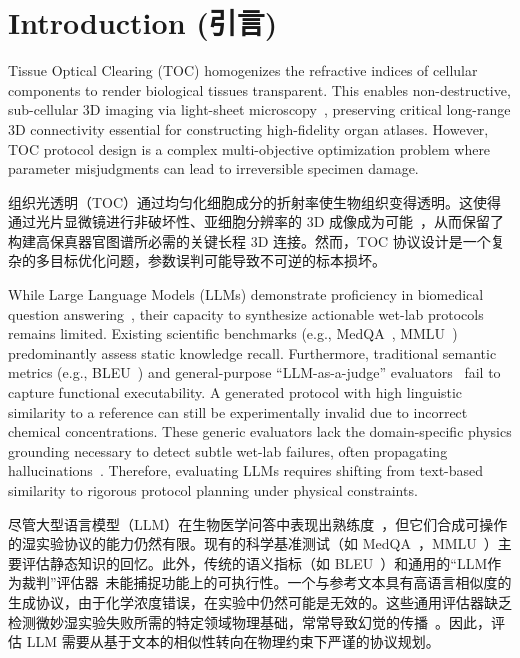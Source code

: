 \documentclass[runningheads]{llncs}
\begin{document}
\section{Introduction (引言)}

Tissue Optical Clearing (TOC) homogenizes the refractive indices of cellular components to render biological tissues transparent. This enables non-destructive, sub-cellular 3D imaging via light-sheet microscopy~\cite{ueda2020tissue,chung2013clarity}, preserving critical long-range 3D connectivity essential for constructing high-fidelity organ atlases. However, TOC protocol design is a complex multi-objective optimization problem where parameter misjudgments can lead to irreversible specimen damage.

组织光透明（TOC）通过均匀化细胞成分的折射率使生物组织变得透明。这使得通过光片显微镜进行非破坏性、亚细胞分辨率的 3D 成像成为可能~\cite{ueda2020tissue,chung2013clarity}，从而保留了构建高保真器官图谱所必需的关键长程 3D 连接。然而，TOC 协议设计是一个复杂的多目标优化问题，参数误判可能导致不可逆的标本损坏。

While Large Language Models (LLMs) demonstrate proficiency in biomedical question answering~\cite{singhal2023medpalm}, their capacity to synthesize actionable wet-lab protocols remains limited. Existing scientific benchmarks (e.g., MedQA~\cite{jin2021disease}, MMLU~\cite{hendrycks2021mmlu}) predominantly assess static knowledge recall. Furthermore, traditional semantic metrics (e.g., BLEU~\cite{papineni2002bleu}) and general-purpose ``LLM-as-a-judge'' evaluators~\cite{liu2023geval} fail to capture functional executability. A generated protocol with high linguistic similarity to a reference can still be experimentally invalid due to incorrect chemical concentrations. These generic evaluators lack the domain-specific physics grounding necessary to detect subtle wet-lab failures, often propagating hallucinations~\cite{bang2025hallulens}. Therefore, evaluating LLMs requires shifting from text-based similarity to rigorous protocol planning under physical constraints.

尽管大型语言模型（LLM）在生物医学问答中表现出熟练度~\cite{singhal2023medpalm}，但它们合成可操作的湿实验协议的能力仍然有限。现有的科学基准测试（如 MedQA~\cite{jin2021disease}，MMLU~\cite{hendrycks2021mmlu}）主要评估静态知识的回忆。此外，传统的语义指标（如 BLEU~\cite{papineni2002bleu}）和通用的“LLM作为裁判”评估器~\cite{liu2023geval}未能捕捉功能上的可执行性。一个与参考文本具有高语言相似度的生成协议，由于化学浓度错误，在实验中仍然可能是无效的。这些通用评估器缺乏检测微妙湿实验失败所需的特定领域物理基础，常常导致幻觉的传播~\cite{bang2025hallulens}。因此，评估 LLM 需要从基于文本的相似性转向在物理约束下严谨的协议规划。
\end{document}
